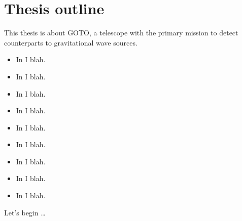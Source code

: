 \section{Thesis outline}
\label{sec:outline}
\begin{colsection}

 This thesis is about GOTO, a telescope with the primary mission to detect counterparts to gravitational wave sources.
%
\begin{itemize}
    \item In  I blah.
    \item In  I blah.
    \item In  I blah.
    \item In  I blah.
    \item In  I blah.
    \item In  I blah.
    \item In  I blah.
    \item In  I blah.
    \item In  I blah.
\end{itemize}
%
Let's begin \ldots

\end{colsection}

